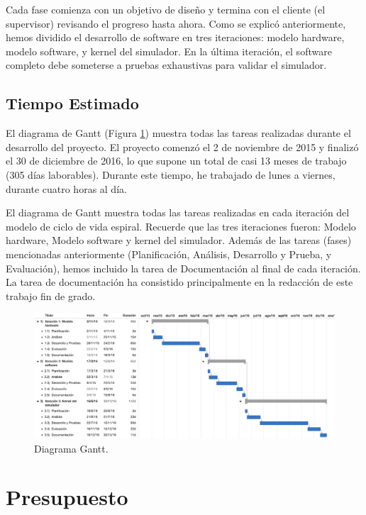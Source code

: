 Cada fase comienza con un objetivo de diseño y termina con el cliente (el supervisor) revisando el progreso hasta ahora. Como se explicó anteriormente, hemos dividido el desarrollo de software en tres iteraciones: modelo hardware, modelo software, y kernel del simulador. En la última iteración, el software completo debe someterse a pruebas exhaustivas para validar el simulador.

\subsection{Tiempo Estimado}

El diagrama de Gantt (Figura \ref{fig:gantt}) muestra todas las tareas realizadas durante el desarrollo del proyecto. El proyecto comenzó el 2 de noviembre de 2015 y finalizó el 30 de diciembre de 2016, lo que supone un total de casi 13 meses de trabajo (305 días laborables). Durante este tiempo, he trabajado de lunes a viernes, durante cuatro horas al día.

El diagrama de Gantt muestra todas las tareas realizadas en cada iteración del modelo de ciclo de vida espiral. Recuerde que las tres iteraciones fueron: Modelo hardware, Modelo software y kernel del simulador. Además de las tareas (fases) mencionadas anteriormente (Planificación, Análisis, Desarrollo y Prueba, y Evaluación), hemos incluido la tarea de Documentación al final de cada iteración. La tarea de documentación ha consistido principalmente en la redacción de este trabajo fin de grado.

\begin{figure}[htbp]
 	\centering
 	\includegraphics[width=16.5cm]{figures/ganttFuente}
 	\caption{Diagrama Gantt.}
	\label{fig:gantt}
\end{figure}

\section{Presupuesto}
\label{sec:budget}

